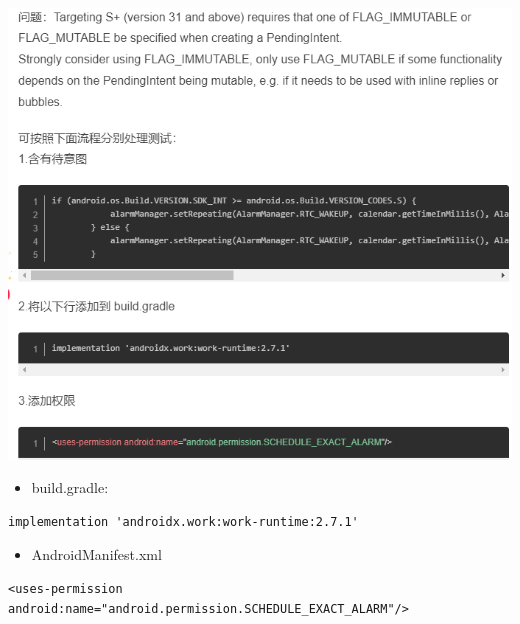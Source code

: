 \documentclass[9pt, b5paper]{article}
\begin{document}
\includegraphics[width=.9\linewidth]{./pic/notes_20221226_203239.png}
\begin{itemize}
\item build.gradle:
\end{itemize}
\begin{verbatim}
implementation 'androidx.work:work-runtime:2.7.1'
\end{verbatim}
\begin{itemize}
\item AndroidManifest.xml
\end{itemize}
\begin{verbatim}
<uses-permission android:name="android.permission.SCHEDULE_EXACT_ALARM"/>
\end{verbatim}
\end{document}
